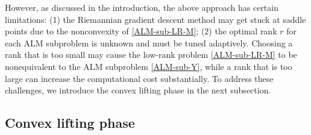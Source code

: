 \documentclass[11pt]{article}
\theoremstyle{plain}
\begin{document}
However, as discussed in the introduction, the above approach has certain limitations: (1) the Riemannian gradient descent method may get stuck at saddle points due to the nonconvexity of \eqref{ALM-sub-LR-M}; (2) the optimal rank $r$ for each ALM subproblem is unknown and must be tuned adaptively. Choosing a rank that is too small may cause the low-rank problem \eqref{ALM-sub-LR-M} to be nonequivalent to the ALM subproblem \eqref{ALM-sub-Y}, while a rank that is too large can increase the computational cost substantially. To address these challenges, we introduce the convex lifting phase in the next subsection.




\subsection{Convex lifting phase}\label{subsec-CVX-phase}
\end{document}
